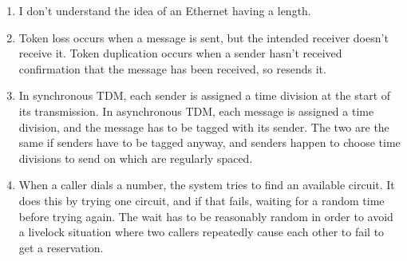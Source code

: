 \documentclass{article}
\begin{document}
\begin{enumerate}
\begin{enumerate}
      \item I don't understand the idea of an Ethernet having a length.
      \item Token loss occurs when a message is sent, but the intended receiver doesn't receive it. Token duplication occurs when a sender hasn't received confirmation that the message has been received, so resends it.
      \item In synchronous TDM, each sender is assigned a time division at the start of its transmission. In asynchronous TDM, each message is assigned a time division, and the message has to be tagged with its sender. The two are the same if senders have to be tagged anyway, and senders happen to choose time divisions to send on which are regularly spaced.
      \item When a caller dials a number, the system tries to find an available circuit. It does this by trying one circuit, and if that fails, waiting for a random time before trying again. The wait has to be reasonably random in order to avoid a livelock situation where two callers repeatedly cause each other to fail to get a reservation.
    \end{enumerate}
\end{enumerate}
\end{document}
